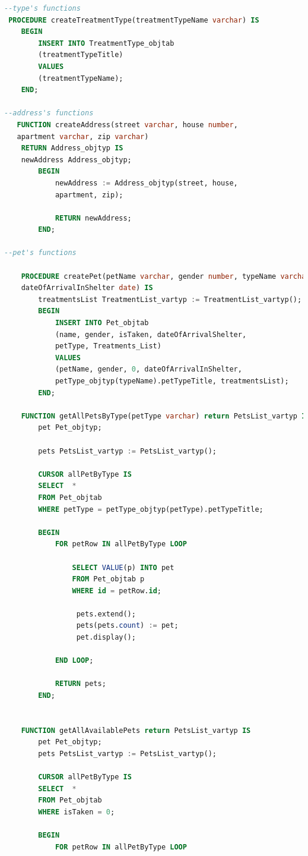 \documentclass{FR16}
\begin{document}
\begin{lstlisting}[language=Sql, basicstyle=\scriptsize]
--type's functions 
 PROCEDURE createTreatmentType(treatmentTypeName varchar) IS
    BEGIN 
        INSERT INTO TreatmentType_objtab
        (treatmentTypeTitle)
        VALUES
        (treatmentTypeName);
    END;

--address's functions
   FUNCTION createAddress(street varchar, house number, 
   apartment varchar, zip varchar) 
    RETURN Address_objtyp IS
    newAddress Address_objtyp;
        BEGIN
            newAddress := Address_objtyp(street, house, 
            apartment, zip);
            
            RETURN newAddress;
        END;

--pet's functions

    PROCEDURE createPet(petName varchar, gender number, typeName varchar,
    dateOfArrivalInShelter date) IS
        treatmentsList TreatmentList_vartyp := TreatmentList_vartyp();
        BEGIN
            INSERT INTO Pet_objtab
            (name, gender, isTaken, dateOfArrivalShelter, 
            petType, Treatments_List)
            VALUES
            (petName, gender, 0, dateOfArrivalInShelter, 
            petType_objtyp(typeName).petTypeTitle, treatmentsList);
        END;

    FUNCTION getAllPetsByType(petType varchar) return PetsList_vartyp IS
        pet Pet_objtyp;

        pets PetsList_vartyp := PetsList_vartyp();

        CURSOR allPetByType IS
		SELECT  *
		FROM Pet_objtab
        WHERE petType = petType_objtyp(petType).petTypeTitle;

        BEGIN 
		    FOR petRow IN allPetByType LOOP
                
                SELECT VALUE(p) INTO pet
                FROM Pet_objtab p
                WHERE id = petRow.id;

                 pets.extend();
                 pets(pets.count) := pet;
                 pet.display();

            END LOOP;

            RETURN pets;
        END;


    FUNCTION getAllAvailablePets return PetsList_vartyp IS
        pet Pet_objtyp;
        pets PetsList_vartyp := PetsList_vartyp();

        CURSOR allPetByType IS
		SELECT  *
		FROM Pet_objtab
        WHERE isTaken = 0;

        BEGIN 
		    FOR petRow IN allPetByType LOOP
                

\end{lstlisting}
\end{document}
